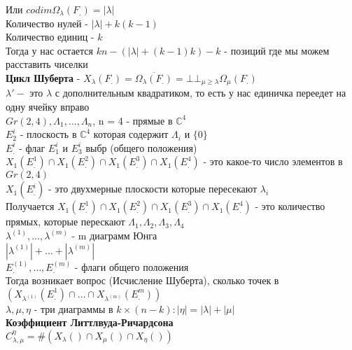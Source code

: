 \documentclass{article}
\newcommand\0{\mathbb{0}}
\newcommand\1{\mathbb{1}}
\renewcommand{\bf}{\textbf}
\begin{document}
Или $codim\Omega_\lambda(F_.) = |\lambda|$\\
Количество нулей - $|\lambda| + k(k - 1)$\\
Количество единиц - $k$\\
Тогда у нас остается $kn - (|\lambda| + (k - 1)k) - k$ - позиций где мы можем расставить чиселки\\
\bf{Цикл Шуберта} - $X_\lambda(F_.) = \overline{\Omega_\lambda(F_.)} = \bot\bot_{\mu \geq \lambda} \Omega_\mu(F_.)$\\
$\lambda' -$ это $\lambda$ с дополнительным квадратиком, то есть у нас единичка переедет на одну ячейку вправо\\
$Gr(2, 4), \Lambda_1, \dots, \Lambda_n$, n = 4 - прямые в $\mathbb{C}^4$\\
$E_2^i$ - плоскость в $\mathbb{C}^4$ которая содержит $\Lambda_i$ и $\{0\}$\\
$E_.^i$ - флаг $E_1^i$ и $E_3^i$ выбр (общего положения)\\
$X_1(E_.^1) \cap X_1(E_.^2) \cap X_1(E_.^3) \cap X_1(E_.^4)$ - это какое-то число элементов в $Gr(2, 4)$\\
$X_1(E_.^i)$ - это двухмерные плоскости которые пересекают $\lambda_i$\\
Получается $X_1(E_.^1) \cap X_1(E_.^2) \cap X_1(E_.^3) \cap X_1(E_.^4)$ - это количество прямых, которые перескают $\Lambda_1, \Lambda_2, \Lambda_3, \Lambda_4$\\
$\lambda^{(1)}, \dots, \lambda^{(m)}$ - m диаграмм Юнга\\
$|\lambda^{(1)}| + \dots + |\lambda^{(m)}|$\\
$E_.^{(1)}, \dots, E_.^{(m)}$ - флаги общего положения\\
Тогда возникает вопрос (Исчисление Шуберта), сколько точек в $(X_{\lambda^{(1)}}(E_.^1) \cap \dots \cap X_{\lambda^{(m)}}(E_.^m))$\\
$\lambda, \mu, \eta$ - три диаграммы в $k \times (n - k): |\eta| = |\lambda| + |\mu|$\\
\bf{Коэффициент Литтлвуда-Ричардсона}\\
$C_{\lambda, \mu}^\eta = \#(X_\lambda() \cap X_\mu() \cap X_\eta())$
\end{document}
